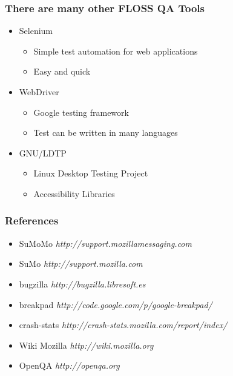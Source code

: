 \documentclass{beamer}
\begin{document}
\begin{frame}
 \frametitle{There are many other FLOSS QA Tools}
 \begin{itemize}
    \item Selenium
        \begin{itemize}
        \item Simple test automation for web applications
        \item Easy and quick
        \end{itemize}
    \item WebDriver
        \begin{itemize}
        \item Google testing framework
        \item Test can be written in many languages
        \end{itemize}
    \item GNU/LDTP
        \begin{itemize}
        \item Linux Desktop Testing Project 
        \item Accessibility Libraries
        \end{itemize}
  \end{itemize}

\end{frame}


\begin{frame}
 \frametitle{References}
 \begin{itemize}
    \item SuMoMo \textit{http://support.mozillamessaging.com}
    \item SuMo \textit{http://support.mozilla.com}
    \item bugzilla \textit{http://bugzilla.libresoft.es}
    \item breakpad \textit{http://code.google.com/p/google-breakpad/}
    \item crash-stats \textit{http://crash-stats.mozilla.com/report/index/}
    \item Wiki Mozilla \textit{http://wiki.mozilla.org}
    \item OpenQA \textit{http://openqa.org}
  \end{itemize}

\end{frame}

\end{document}
